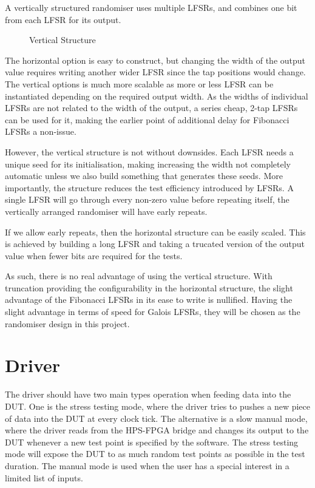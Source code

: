 A vertically structured randomiser uses multiple LFSRs, and combines one bit from each LFSR for its output.

\begin{figure}[H]
  \centering
  
  \caption{Vertical Structure}
  \label{VertLFSR}
\end{figure}

The horizontal option is easy to construct, but changing the width of the output value requires writing another wider LFSR since the tap positions would change.
The vertical options is much more scalable as more or less LFSR can be instantiated depending on the required output width.
As the widths of individual LFSRs are not related to the width of the output, a series cheap, 2-tap LFSRs can be used for it, making the earlier point of additional delay for Fibonacci LFSRs a non-issue.

However, the vertical structure is not without downsides.
Each LFSR needs a unique seed for its initialisation, making increasing the width not completely automatic unless we also build something that generates these seeds.
More importantly, the structure reduces the test efficiency introduced by LFSRs.
A single LFSR will go through every non-zero value before repeating itself, the vertically arranged randomiser will have early repeats.

If we allow early repeats, then the horizontal structure can be easily scaled.
This is achieved by building a long LFSR and taking a trucated version of the output value when fewer bits are required for the tests.

As such, there is no real advantage of using the vertical structure.
With truncation providing the configurability in the horizontal structure, the slight advantage of the Fibonacci LFSRs in its ease to write is nullified.
Having the slight advantage in terms of speed for Galois LFSRs, they will be chosen as the randomiser design in this project.

\section{Driver}

The driver should have two main types operation when feeding data into the DUT.
One is the stress testing mode, where the driver tries to pushes a new piece of data into the DUT at every clock tick.
The alternative is a slow manual mode, where the driver reads from the HPS-FPGA bridge and changes its output to the DUT whenever a new test point is specified by the software.
The stress testing mode will expose the DUT to as much random test points as possible in the test duration.
The manual mode is used when the user has a special interest in a limited list of inputs.

